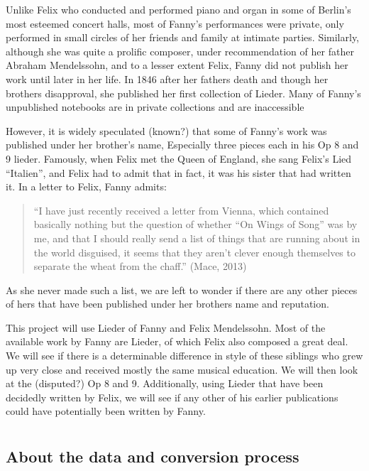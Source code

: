 \documentclass[12pt,twoside]{reedthesis}
\theoremstyle{definition}
\theoremstyle{definition}
\theoremstyle{definition}
\theoremstyle{remark}
\begin{document}
Unlike Felix who conducted and performed piano and organ in some of
Berlin's most esteemed concert halls, most of Fanny's performances were
private, only performed in small circles of her friends and family at
intimate parties. Similarly, although she was quite a prolific composer,
under recommendation of her father Abraham Mendelssohn, and to a lesser
extent Felix, Fanny did not publish her work until later in her life. In
1846 after her fathers death and though her brothers disapproval, she
published her first collection of Lieder. Many of Fanny's unpublished
notebooks are in private collections and are inaccessible

However, it is widely speculated (known?) that some of Fanny's work was
published under her brother's name, Especially three pieces each in his
Op 8 and 9 lieder. Famously, when Felix met the Queen of England, she
sang Felix's Lied ``Italien'', and Felix had to admit that in fact, it
was his sister that had written it. In a letter to Felix, Fanny admits:
\begin{quote}
``I have just recently received a letter from Vienna, which contained
basically nothing but the question of whether ``On Wings of Song'' was
by me, and that I should really send a list of things that are running
about in the world disguised, it seems that they aren't clever enough
themselves to separate the wheat from the chaff.'' (Mace, 2013)
\end{quote}
As she never made such a list, we are left to wonder if there are any
other pieces of hers that have been published under her brothers name
and reputation.

This project will use Lieder of Fanny and Felix Mendelssohn. Most of the
available work by Fanny are Lieder, of which Felix also composed a great
deal. We will see if there is a determinable difference in style of
these siblings who grew up very close and received mostly the same
musical education. We will then look at the (disputed?) Op 8 and 9.
Additionally, using Lieder that have been decidedly written by Felix, we
will see if any other of his earlier publications could have potentially
been written by Fanny.

\chapter{}\label{section-1}

\section{About the data and conversion
process}\label{about-the-data-and-conversion-process}
\end{document}
